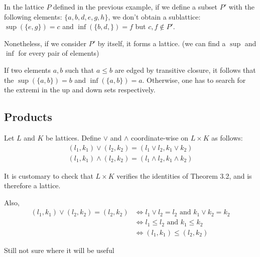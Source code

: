 \begin{example} In the lattice $P$ defined in the previous example, if we define
a subset $P'$ with the following elements: $\{a,b,d,e,g,h\}$, we don't obtain a
sublattice: $\sup(\{e,g\}) = c$ and $\inf(\{b,d,\}) = f$ but $c,f \notin P'$.

Nonetheless, if we consider $P'$ by itself, it forms a lattice. (we can find a
$\sup$ and $\inf$ for every pair of elements)
\end{example}


\begin{remark} If two elements $a,b$ such that $a \leq b$ are edged by
transitive closure, it follows that the $\sup(\{a,b\}) = b$ and $\inf(\{a,b\}) =
a$. Otherwise, one has to search for the extremi in the up and down sets
respectively.
\end{remark}

\subsection{Products}

\begin{definition}[products] Let $L$ and $K$ be lattices. Define $\lor$ and
$\land$ coordinate-wise on $L \times K$ as follows:
\begin{align*}
	(l_1, k_1) \lor (l_2,k_2) = (l_1 \lor l_2, k_1 \lor k_2) \\ (l_1,
k_1) \land (l_2,k_2) = (l_1 \land l_2, k_1 \land k_2)
\end{align*}
\end{definition}

\begin{prop} It is customary to check that $L \times K$ verifies the identities
of Theorem 3.2, and is therefore a lattice.

Also,
\begin{align*} (l_1,k_1) \lor (l_2,k_2) = (l_2,k_2) & \iff l_1 \lor l_2 = l_2
\text{ and } k_1 \lor k_2 = k_2 \\ & \iff l_1 \leq l_2 \text{ and } k_1 \leq k_2
\\ & \iff (l_1, k_1) \leq (l_2,k_2)
\end{align*}
\end{prop}

\begin{example}

\end{example}

\begin{remark} Still not sure where it will be useful
\end{remark}

